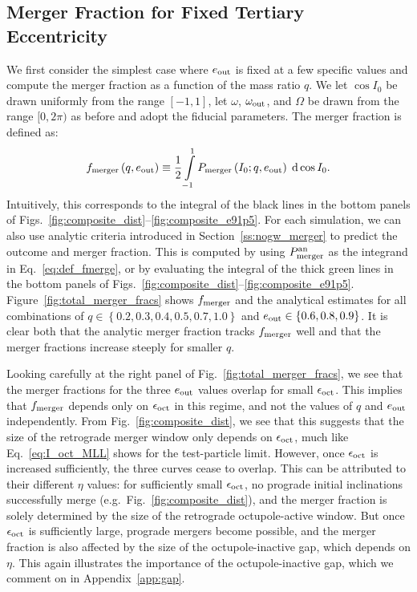 \documentclass[
        fleqn,
        usenatbib,
    ]{mnras}
\newcommand*{\p}[1]{\left(#1\right)}
\newcommand*{\z}[1]{\left\{#1\right\}}
\begin{document}
\subsection{Merger Fraction for Fixed Tertiary Eccentricity}

We first consider the simplest case where $e_{\rm out}$ is fixed at a few
specific values and compute the merger fraction as a function of the mass ratio
$q$. We let $\cos I_0$ be drawn uniformly from the range $[-1, 1]$, let
$\omega$, $\omega_{\rm out}$, and $\Omega$ be drawn from the range $[0,
2\pi)$ as before %
and adopt the fiducial parameters. The merger fraction is defined as:
\begin{equation}
    f_{\rm merger}\p{q, e_{\rm out}} \equiv
        \frac{1}{2}\int\limits_{-1}^1P_{\rm merger}\p{I_0; q, e_{\rm out}}
            \;\mathrm{d}\cos I_0.\label{eq:def_fmerge}
\end{equation}
Intuitively, this corresponds to the integral of the black lines in the bottom
panels of Figs.~\ref{fig:composite_dist}--\ref{fig:composite_e91p5}. For each
simulation, we can also use analytic criteria introduced in
Section~\ref{ss:nogw_merger} to predict the outcome and merger fraction. This is
computed by using $P_{\rm merger}^{\rm an}$ as the integrand in
Eq.~\eqref{eq:def_fmerge}, or by evaluating the integral of the thick green
lines in the bottom panels of
Figs.~\ref{fig:composite_dist}--\ref{fig:composite_e91p5}.
Figure~\ref{fig:total_merger_fracs} shows $f_{\rm merger}$ and the analytical
estimates for all combinations
of $q \in \z{0.2, 0.3, 0.4, 0.5, 0.7, 1.0}$ and $e_{\rm out} \in \z{0.6, 0.8,
0.9}$. It is clear both that the analytic merger fraction tracks $f_{\rm
merger}$ well and that the merger fractions increase steeply for smaller $q$.

Looking carefully at the right panel of Fig.~\ref{fig:total_merger_fracs}, we
see that the merger fractions for the three $e_{\rm out}$ values overlap for
small $\epsilon_{\rm oct}$. This implies that $f_{\rm merger}$ depends only on
$\epsilon_{\rm oct}$ in this regime, and not the values of $q$ and $e_{\rm out}$
independently. From Fig.~\ref{fig:composite_dist}, we see that this suggests
that the size of the retrograde merger window only depends on $\epsilon_{\rm
oct}$, much like Eq.~\eqref{eq:I_oct_MLL} shows for the test-particle limit.
However, once $\epsilon_{\rm oct}$ is increased sufficiently, the three curves
cease to overlap. This can be attributed to their different $\eta$ values: for
sufficiently small $\epsilon_{\rm oct}$, no prograde initial inclinations
successfully merge (e.g.\ Fig.~\ref{fig:composite_dist}), and the merger
fraction is solely determined by the size of the retrograde octupole-active
window. But once $\epsilon_{\rm oct}$ is sufficiently large, prograde mergers
become possible, and the merger fraction is also affected by the size of the
octupole-inactive gap, which depends on $\eta$. This again illustrates the
importance of the octupole-inactive gap, which we comment on in
Appendix~\ref{app:gap}.
\end{document}
